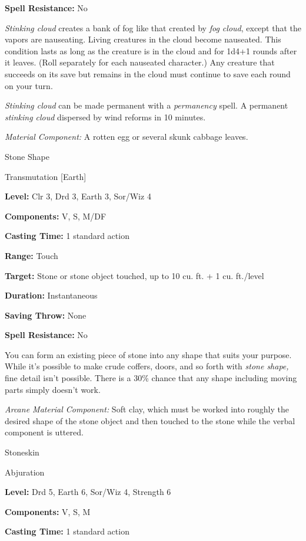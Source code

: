 \documentclass{article}
\begin{document}
\textbf{Spell Resistance:} No

\textit{Stinking cloud }creates a bank of fog like that created by \textit{fog 
cloud}, except that the vapors are nauseating. Living creatures in the cloud become 
nauseated. This condition lasts as long as the creature is in the cloud and for 
1d4+1 rounds after it leaves. (Roll separately for each nauseated character.) Any 
creature that succeeds on its save but remains in the cloud must continue to save 
each round on your turn.

\textit{Stinking cloud }can be made permanent with a \textit{permanency }spell. 
A permanent \textit{stinking cloud }dispersed by wind reforms in 10 minutes.

\textit{Material Component: }A rotten egg or several skunk cabbage leaves.

\vspace{12pt}
Stone Shape

Transmutation [Earth]

\textbf{Level:} Clr 3, Drd 3, Earth 3, Sor/Wiz 4

\textbf{Components:} V, S, M/DF

\textbf{Casting Time:} 1 standard action

\textbf{Range:} Touch

\textbf{Target:} Stone or stone object touched, up to 10 cu. ft. + 1 cu. ft./level

\textbf{Duration:} Instantaneous

\textbf{Saving Throw:} None

\textbf{Spell Resistance:} No

You can form an existing piece of stone into any shape that suits your purpose. 
While it's possible to make crude coffers, doors, and so forth with \textit{stone 
shape, }fine detail isn't possible. There is a 30\% chance that any shape including 
moving parts simply doesn't work.

\textit{Arcane Material Component: }Soft clay, which must be worked into roughly 
the desired shape of the stone object and then touched to the stone while the verbal 
component is uttered.

\vspace{12pt}
Stoneskin

Abjuration

\textbf{Level:} Drd 5, Earth 6, Sor/Wiz 4, Strength 6

\textbf{Components:} V, S, M

\textbf{Casting Time:} 1 standard action
\end{document}
